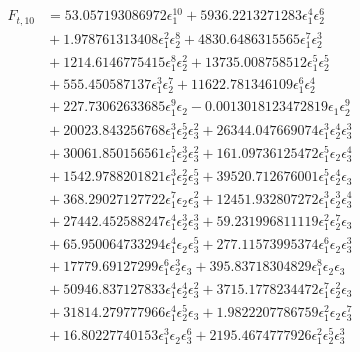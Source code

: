\documentclass[10pt]{article}
\begin{document}
\begin{align*}
F_{t,10} &= 53.057193086972 \epsilon_{1}^{10} + 5936.2213271283 \epsilon_{1}^{4} \epsilon_{2}^{6} \\
&{}  + 1.978761313408 \epsilon_{1}^{2} \epsilon_{2}^{8} + 4830.6486315565 \epsilon_{1}^{7} \epsilon_{2}^{3} \\
&{}  + 1214.6146775415 \epsilon_{1}^{8} \epsilon_{2}^{2} + 13735.008758512 \epsilon_{1}^{5} \epsilon_{2}^{5} \\
&{}  + 555.450587137 \epsilon_{1}^{3} \epsilon_{2}^{7} + 11622.781346109 \epsilon_{1}^{6} \epsilon_{2}^{4} \\
&{}  + 227.73062633685 \epsilon_{1}^{9} \epsilon_{2} - 0.0013018123472819 \epsilon_{1} \epsilon_{2}^{9} \\
&{}  + 20023.843256768 \epsilon_{1}^{3} \epsilon_{2}^{5} \epsilon_{3}^{2} + 26344.047669074 \epsilon_{1}^{3} \epsilon_{2}^{4} \epsilon_{3}^{3} \\
&{}  + 30061.850156561 \epsilon_{1}^{5} \epsilon_{2}^{3} \epsilon_{3}^{2} + 161.09736125472 \epsilon_{1}^{5} \epsilon_{2} \epsilon_{3}^{4} \\
&{}  + 1542.9788201821 \epsilon_{1}^{3} \epsilon_{2}^{2} \epsilon_{3}^{5} + 39520.712676001 \epsilon_{1}^{5} \epsilon_{2}^{4} \epsilon_{3} \\
&{}  + 368.29027127722 \epsilon_{1}^{7} \epsilon_{2} \epsilon_{3}^{2} + 12451.932807272 \epsilon_{1}^{3} \epsilon_{2}^{3} \epsilon_{3}^{4} \\
&{}  + 27442.452588247 \epsilon_{1}^{4} \epsilon_{2}^{3} \epsilon_{3}^{3} + 59.231996811119 \epsilon_{1}^{2} \epsilon_{2}^{7} \epsilon_{3} \\
&{}  + 65.950064733294 \epsilon_{1}^{4} \epsilon_{2} \epsilon_{3}^{5} + 277.11573995374 \epsilon_{1}^{6} \epsilon_{2} \epsilon_{3}^{3} \\
&{}  + 17779.69127299 \epsilon_{1}^{6} \epsilon_{2}^{3} \epsilon_{3} + 395.83718304829 \epsilon_{1}^{8} \epsilon_{2} \epsilon_{3} \\
&{}  + 50946.837127833 \epsilon_{1}^{4} \epsilon_{2}^{4} \epsilon_{3}^{2} + 3715.1778234472 \epsilon_{1}^{7} \epsilon_{2}^{2} \epsilon_{3} \\
&{}  + 31814.279777966 \epsilon_{1}^{4} \epsilon_{2}^{5} \epsilon_{3} + 1.9822207786759 \epsilon_{1}^{2} \epsilon_{2} \epsilon_{3}^{7} \\
&{}  + 16.80227740153 \epsilon_{1}^{3} \epsilon_{2} \epsilon_{3}^{6} + 2195.4674777926 \epsilon_{1}^{2} \epsilon_{2}^{5} \epsilon_{3}^{3} \\

\end{align*}
\end{document}
